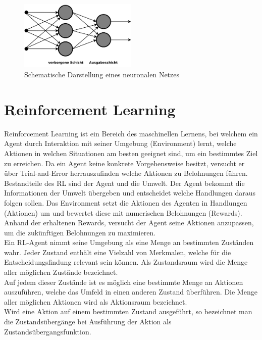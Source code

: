 \begin{figure}[!htb]
	\centering
	\includegraphics[width=0.5\textwidth]{Bilder/AufbauNN.png}
	\caption{Schematische Darstellung eines neuronalen Netzes \cite{noauthor_kunstliche_nodate}}
    \label{fig:neuronalesNetz}
\end{figure}



\clearpage
\section{Reinforcement Learning}
Reinforcement Learning ist ein Bereich des maschinellen Lernens, bei welchem ein Agent durch Interaktion mit seiner Umgebung (Environment) lernt, welche Aktionen in welchen Situationen am besten geeignet sind, um ein bestimmtes Ziel zu erreichen. Da ein Agent keine konkrete Vorgehensweise besitzt, versucht er über Trial-and-Error herrauszufinden welche Aktionen zu Belohnungen führen. \\
Bestandteile des RL sind der Agent und die Umwelt. Der Agent bekommt die Informationen der Umwelt übergeben und entscheidet welche Handlungen daraus folgen sollen. Das Environment setzt die Aktionen des Agenten in Handlungen (Aktionen) um und bewertet diese mit numerischen Belohnungen (Rewards). Anhand der erhaltenen Rewards, versucht der Agent seine Aktionen anzupassen, um die zukünftigen Belohnungen zu maximieren. \\
Ein RL-Agent nimmt seine Umgebung als eine Menge an bestimmten Zuständen wahr.
Jeder Zustand enthält eine Vielzahl von Merkmalen, welche für die Entscheidungsfindung relevant sein können.
Als Zustandsraum wird die Menge aller möglichen Zustände bezeichnet.\\
Auf jedem dieser Zustände ist es möglich eine bestimmte Menge an Aktionen auszuführen, welche das Umfeld in einen anderen Zustand überführen.
Die Menge aller möglichen Aktionen wird als Aktionsraum bezeichnet.\\
Wird eine Aktion auf einem bestimmten Zustand ausgeführt, so bezeichnet man die Zustandsübergänge bei Ausführung der Aktion als Zustandsübergangsfunktion.\\
